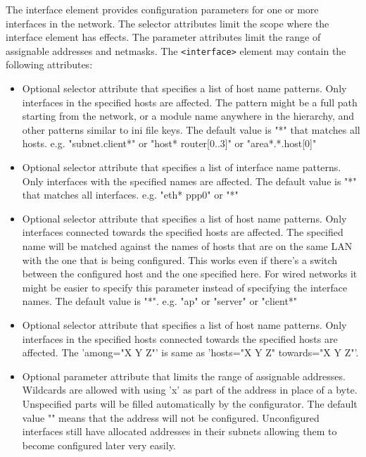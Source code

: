 The interface element provides configuration parameters for one or more
interfaces in the network. The selector attributes limit the scope where
the interface element has effects. The parameter attributes limit the
range of assignable addresses and netmasks.
The \verb!<interface>! element may contain the following attributes:
\begin{itemize}
    \item {}
      Optional selector attribute that specifies a list of host name patterns.
      Only interfaces in the specified hosts are affected. The pattern might
      be a full path starting from the network, or a module name anywhere in
      the hierarchy, and other patterns similar to ini file keys. The default
      value is "*" that matches all hosts.
      e.g. "subnet.client*" or "host* router[0..3]" or "area*.*.host[0]"
    \item {}
      Optional selector attribute that specifies a list of interface name
      patterns. Only interfaces with the specified names are affected. The
      default value is "*" that matches all interfaces.
      e.g. "eth* ppp0" or "*"
    \item {}
      Optional selector attribute that specifies a list of host name patterns.
      Only interfaces connected towards the specified hosts are affected. The
      specified name will be matched against the names of hosts that are on
      the same LAN with the one that is being configured. This works even if
      there's a switch between the configured host and the one specified here.
      For wired networks it might be easier to specify this parameter instead
      of specifying the interface names. The default value is "*".
      e.g. "ap" or "server" or "client*"
    \item {}
      Optional selector attribute that specifies a list of host name patterns.
      Only interfaces in the specified hosts connected towards the specified
      hosts are affected.
      The 'among="X Y Z"' is same as 'hosts="X Y Z" towards="X Y Z"'.
    \item {}
      Optional parameter attribute that limits the range of assignable
      addresses. Wildcards are allowed with using 'x' as part of the address
      in place of a byte. Unspecified parts will be filled automatically by
      the configurator. The default value "" means that the address will not
      be configured. Unconfigured interfaces still have allocated addresses
      in their subnets allowing them to become configured later very easily.

\end{itemize}
